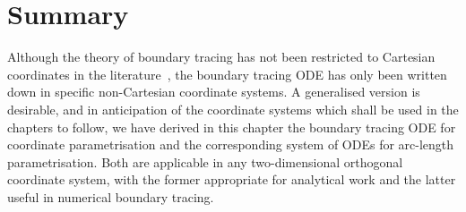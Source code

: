 \section{Summary}
\label{sec:curvilinear.summary}

Although the theory of boundary tracing
has not been restricted to Cartesian coordinates in the literature~\cite{
  anderson-2002-thesis-boundary-tracing-pdes,
  anderson-2007-boundary-tracing-i-theory,
  anderson-2007-boundary-tracing-ii-applications
},
the boundary tracing ODE has only been written down
in specific non-Cartesian coordinate systems.
A generalised version is desirable,
and in anticipation of the coordinate systems
which shall be used in the chapters to follow,
we have derived in this chapter
the boundary tracing ODE for coordinate parametrisation
and the corresponding system of ODEs for arc-length parametrisation.
Both are applicable in any two-dimensional orthogonal coordinate system,
with the former appropriate for analytical work
and the latter useful in numerical boundary tracing.
